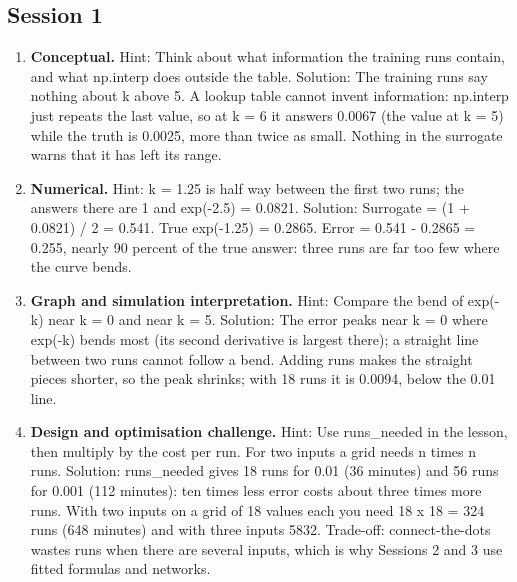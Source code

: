 \documentclass[11pt,a4paper]{article}
\begin{document}
\subsection*{Session 1}
\begin{enumerate}[nosep]
\item \textbf{Conceptual.} Hint: Think about what information the training runs contain, and what np.interp does outside the table. Solution: The training runs say nothing about k above 5. A lookup table cannot invent information: np.interp just repeats the last value, so at k = 6 it answers 0.0067 (the value at k = 5) while the truth is 0.0025, more than twice as small. Nothing in the surrogate warns that it has left its range.
\item \textbf{Numerical.} Hint: k = 1.25 is half way between the first two runs; the answers there are 1 and exp(-2.5) = 0.0821. Solution: Surrogate = (1 + 0.0821) / 2 = 0.541. True exp(-1.25) = 0.2865. Error = 0.541 - 0.2865 = 0.255, nearly 90 percent of the true answer: three runs are far too few where the curve bends.
\item \textbf{Graph and simulation interpretation.} Hint: Compare the bend of exp(-k) near k = 0 and near k = 5. Solution: The error peaks near k = 0 where exp(-k) bends most (its second derivative is largest there); a straight line between two runs cannot follow a bend. Adding runs makes the straight pieces shorter, so the peak shrinks; with 18 runs it is 0.0094, below the 0.01 line.
\item \textbf{Design and optimisation challenge.} Hint: Use runs\_needed in the lesson, then multiply by the cost per run. For two inputs a grid needs n times n runs. Solution: runs\_needed gives 18 runs for 0.01 (36 minutes) and 56 runs for 0.001 (112 minutes): ten times less error costs about three times more runs. With two inputs on a grid of 18 values each you need 18 x 18 = 324 runs (648 minutes) and with three inputs 5832. Trade-off: connect-the-dots wastes runs when there are several inputs, which is why Sessions 2 and 3 use fitted formulas and networks.
\end{enumerate}
\end{document}
